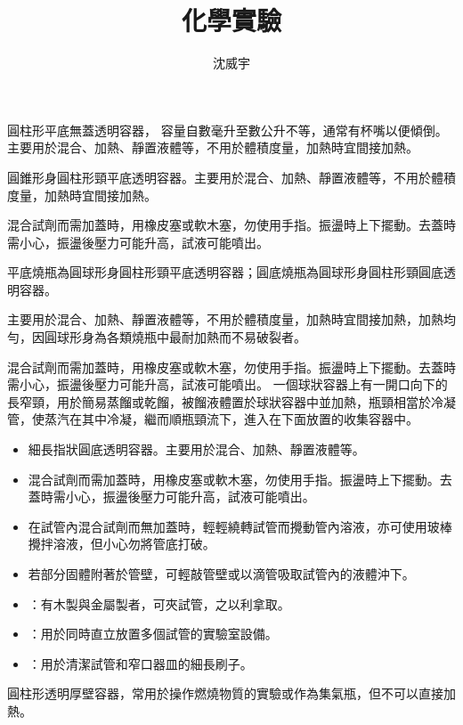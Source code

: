 \documentclass[a4paper,12pt]{article}
\begin{document}
\title{化學實驗}
\author{沈威宇}
\date{\temtoday}
\titletocdoc
{}
圓柱形平底無蓋透明容器， 容量自數毫升至數公升不等，通常有杯嘴以便傾倒。主要用於混合、加熱、靜置液體等，不用於體積度量，加熱時宜間接加熱。
\bit
\item 圓錐形身圓柱形頸平底透明容器。主要用於混合、加熱、靜置液體等，不用於體積度量，加熱時宜間接加熱。
\item 混合試劑而需加蓋時，用橡皮塞或軟木塞，勿使用手指。振盪時上下擺動。去蓋時需小心，振盪後壓力可能升高，試液可能噴出。
\eit
{}
\bit
\item 平底燒瓶為圓球形身圓柱形頸平底透明容器；圓底燒瓶為圓球形身圓柱形頸圓底透明容器。
\item 主要用於混合、加熱、靜置液體等，不用於體積度量，加熱時宜間接加熱，加熱均勻，因圓球形身為各類燒瓶中最耐加熱而不易破裂者。
\item 混合試劑而需加蓋時，用橡皮塞或軟木塞，勿使用手指。振盪時上下擺動。去蓋時需小心，振盪後壓力可能升高，試液可能噴出。
\eit
{}
一個球狀容器上有一開口向下的長窄頸，用於簡易蒸餾或乾餾，被餾液體置於球狀容器中並加熱，瓶頸相當於冷凝管，使蒸汽在其中冷凝，繼而順瓶頸流下，進入在下面放置的收集容器中。
\begin{itemize}
\item 細長指狀圓底透明容器。主要用於混合、加熱、靜置液體等。
\item 混合試劑而需加蓋時，用橡皮塞或軟木塞，勿使用手指。振盪時上下擺動。去蓋時需小心，振盪後壓力可能升高，試液可能噴出。
\item 在試管內混合試劑而無加蓋時，輕輕繞轉試管而攪動管內溶液，亦可使用玻棒攪拌溶液，但小心勿將管底打破。
\item 若部分固體附著於管壁，可輕敲管壁或以滴管吸取試管內的液體沖下。
\item {}：有木製與金屬製者，可夾試管，之以利拿取。
\item {}：用於同時直立放置多個試管的實驗室設備。
\item {}：用於清潔試管和窄口器皿的細長刷子。
\end{itemize}
圓柱形透明厚壁容器，常用於操作燃燒物質的實驗或作為集氣瓶，但不可以直接加熱。
\end{document}
